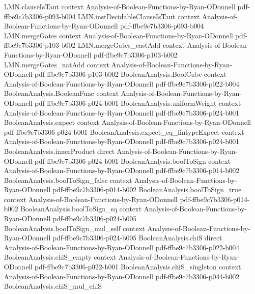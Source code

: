 \begin{lemma}
\proofstep
  {LMN.clauseIsTaut}
  {context}
  {Analysis-of-Boolean-Functions-by-Ryan-ODonnell}
  {pdf-ffbe9c7b3306-p093-b004}
\proofstep
  {LMN.instDecidableClauseIsTaut}
  {context}
  {Analysis-of-Boolean-Functions-by-Ryan-ODonnell}
  {pdf-ffbe9c7b3306-p093-b004}
\proofstep
  {LMN.mergeGates}
  {context}
  {Analysis-of-Boolean-Functions-by-Ryan-ODonnell}
  {pdf-ffbe9c7b3306-p103-b002}
\proofstep
  {LMN.mergeGates_castAdd}
  {context}
  {Analysis-of-Boolean-Functions-by-Ryan-ODonnell}
  {pdf-ffbe9c7b3306-p103-b002}
\proofstep
  {LMN.mergeGates_natAdd}
  {context}
  {Analysis-of-Boolean-Functions-by-Ryan-ODonnell}
  {pdf-ffbe9c7b3306-p103-b002}
\proofstep
  {BooleanAnalysis.BoolCube}
  {context}
  {Analysis-of-Boolean-Functions-by-Ryan-ODonnell}
  {pdf-ffbe9c7b3306-p022-b004}
\proofstep
  {BooleanAnalysis.BooleanFunc}
  {context}
  {Analysis-of-Boolean-Functions-by-Ryan-ODonnell}
  {pdf-ffbe9c7b3306-p024-b001}
\proofstep
  {BooleanAnalysis.uniformWeight}
  {context}
  {Analysis-of-Boolean-Functions-by-Ryan-ODonnell}
  {pdf-ffbe9c7b3306-p024-b001}
\proofstep
  {BooleanAnalysis.expect}
  {context}
  {Analysis-of-Boolean-Functions-by-Ryan-ODonnell}
  {pdf-ffbe9c7b3306-p024-b001}
\proofstep
  {BooleanAnalysis.expect_eq_fintypeExpect}
  {context}
  {Analysis-of-Boolean-Functions-by-Ryan-ODonnell}
  {pdf-ffbe9c7b3306-p024-b001}
\proofstep
  {BooleanAnalysis.innerProduct}
  {direct}
  {Analysis-of-Boolean-Functions-by-Ryan-ODonnell}
  {pdf-ffbe9c7b3306-p024-b001}
\proofstep
  {BooleanAnalysis.boolToSign}
  {context}
  {Analysis-of-Boolean-Functions-by-Ryan-ODonnell}
  {pdf-ffbe9c7b3306-p014-b002}
\proofstep
  {BooleanAnalysis.boolToSign_false}
  {context}
  {Analysis-of-Boolean-Functions-by-Ryan-ODonnell}
  {pdf-ffbe9c7b3306-p014-b002}
\proofstep
  {BooleanAnalysis.boolToSign_true}
  {context}
  {Analysis-of-Boolean-Functions-by-Ryan-ODonnell}
  {pdf-ffbe9c7b3306-p014-b002}
\proofstep
  {BooleanAnalysis.boolToSign_sq}
  {context}
  {Analysis-of-Boolean-Functions-by-Ryan-ODonnell}
  {pdf-ffbe9c7b3306-p024-b005}
\proofstep
  {BooleanAnalysis.boolToSign_mul_self}
  {context}
  {Analysis-of-Boolean-Functions-by-Ryan-ODonnell}
  {pdf-ffbe9c7b3306-p024-b005}
\proofstep
  {BooleanAnalysis.chiS}
  {direct}
  {Analysis-of-Boolean-Functions-by-Ryan-ODonnell}
  {pdf-ffbe9c7b3306-p022-b004}
\proofstep
  {BooleanAnalysis.chiS_empty}
  {context}
  {Analysis-of-Boolean-Functions-by-Ryan-ODonnell}
  {pdf-ffbe9c7b3306-p022-b001}
\proofstep
  {BooleanAnalysis.chiS_singleton}
  {context}
  {Analysis-of-Boolean-Functions-by-Ryan-ODonnell}
  {pdf-ffbe9c7b3306-p044-b002}
\proofstep
  {BooleanAnalysis.chiS_mul_chiS}

\end{lemma}
